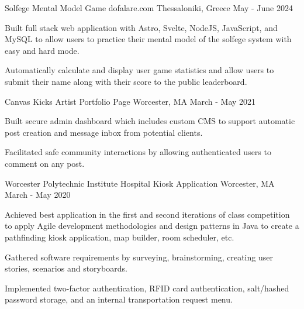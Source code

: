 

\begin{cventries}

\cventry
    {Solfege Mental Model Game} %
    {dofalare.com} %
    {Thessaloniki, Greece} %
    {May - June 2024} %
    {
      \begin{cvitems} %
   \item {Built full stack web application with Astro, Svelte, NodeJS, JavaScript, and MySQL to allow users to practice their mental model of the solfege system with easy and hard mode.}
       \item {Automatically calculate and display user game statistics and allow users to submit their name along with their score to the public leaderboard.}
      \end{cvitems}
    }
\cventry
    {Canvas Kicks} %
    {Artist Portfolio Page} %
    {Worcester, MA} %
    {March - May 2021} %
    {
      \begin{cvitems} %
       \item {Built secure admin dashboard which includes custom CMS to support automatic post creation and message inbox from potential clients.}
       \item {Facilitated safe community interactions by allowing authenticated users to comment on any post.}
      \end{cvitems}
    }


  \cventry
    {Worcester Polytechnic Institute} %
    {Hospital Kiosk Application } %
    {Worcester, MA} %
    {March - May 2020} %
    {
      \begin{cvitems} %
       \item {Achieved best application in the first and second iterations of class competition to apply Agile development methodologies and
        design patterns in Java to create a pathfinding kiosk application, map builder, room scheduler, etc.}
        \item {Gathered software requirements by surveying, brainstorming, creating user stories, scenarios and storyboards.}
        \item {Implemented two-factor authentication, RFID card authentication, salt/hashed password storage, and an internal transportation request menu.}
      \end{cvitems}
    }



\end{cventries}
